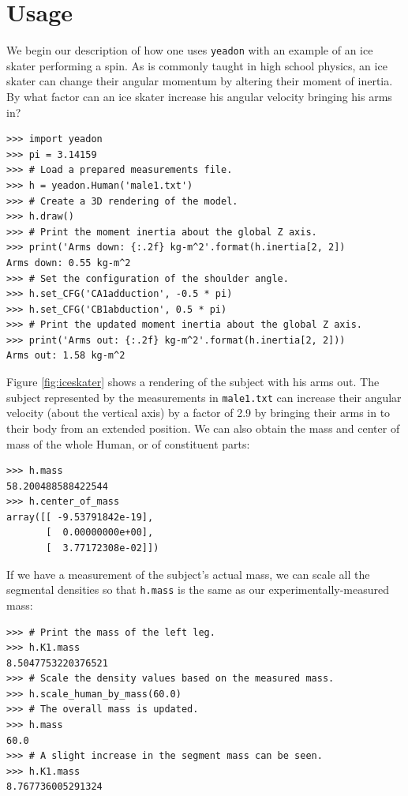 \documentclass[10pt]{article}
\begin{document}
\section*{Usage}
\label{sec:usage}

We begin our description of how one uses \verb+yeadon+ with an example of an
ice skater performing a spin. As is commonly taught in high school physics, an
ice skater can change their angular momentum by altering their moment of
inertia. By what factor can an ice skater increase his angular velocity
bringing his arms in?

\begin{verbatim}
>>> import yeadon
>>> pi = 3.14159
>>> # Load a prepared measurements file.
>>> h = yeadon.Human('male1.txt')
>>> # Create a 3D rendering of the model.
>>> h.draw()
>>> # Print the moment inertia about the global Z axis.
>>> print('Arms down: {:.2f} kg-m^2'.format(h.inertia[2, 2])
Arms down: 0.55 kg-m^2
>>> # Set the configuration of the shoulder angle.
>>> h.set_CFG('CA1adduction', -0.5 * pi)
>>> h.set_CFG('CB1abduction', 0.5 * pi)
>>> # Print the updated moment inertia about the global Z axis.
>>> print('Arms out: {:.2f} kg-m^2'.format(h.inertia[2, 2]))
Arms out: 1.58 kg-m^2
\end{verbatim}

Figure \ref{fig:iceskater} shows a rendering of the subject with his arms out.
The subject represented by the measurements in \verb+male1.txt+ can increase
their angular velocity (about the vertical axis) by a factor of 2.9 by bringing
their arms in to their body from an extended position. We can also obtain the
mass and center of mass of the whole Human, or of constituent parts:

\begin{verbatim}
>>> h.mass
58.200488588422544
>>> h.center_of_mass
array([[ -9.53791842e-19],
       [  0.00000000e+00],
       [  3.77172308e-02]])
\end{verbatim}

If we have a measurement of the subject's actual mass, we can scale all the
segmental densities so that \verb+h.mass+ is the same as our
experimentally-measured mass:

\begin{verbatim}
>>> # Print the mass of the left leg.
>>> h.K1.mass
8.5047753220376521
>>> # Scale the density values based on the measured mass.
>>> h.scale_human_by_mass(60.0)
>>> # The overall mass is updated.
>>> h.mass
60.0
>>> # A slight increase in the segment mass can be seen.
>>> h.K1.mass
8.767736005291324
\end{verbatim}
\end{document}
